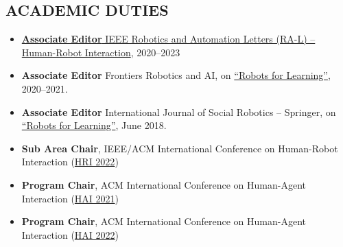 
\subsection{ACADEMIC DUTIES}
\vspace{2pt}

\begin{itemize}
    \item \href{https://www.ieee-ras.org/publications/ra-l/ra-letters-editorial-board#AssocEd}{\textbf{Associate Editor} IEEE Robotics and Automation Letters (RA-L) -- Human-Robot Interaction}, 2020--2023
    \item \textbf{Associate Editor} Frontiers Robotics and AI, on \href{https://www.frontiersin.org/research-topics/14092/robots-for-learning}{``Robots for Learning''}, 2020--2021.
    \item \textbf{Associate Editor} International Journal of Social Robotics -- Springer, on \href{https://link.springer.com/journal/12369/10/3/page/1}{``Robots for Learning''}, June 2018.
    \item \textbf{Sub Area Chair},  IEEE/ACM International Conference on Human-Robot Interaction (\href{https://humanrobotinteraction.org/2022/}{HRI 2022})
    \item \textbf{Program Chair},  ACM International Conference on Human-Agent Interaction (\href{http://hai-conference.net/hai2021/}{HAI 2021})
    \item \textbf{Program Chair},  ACM International Conference on Human-Agent Interaction (\href{http://hai-conference.net/hai2022/}{HAI 2022})
\end{itemize}


